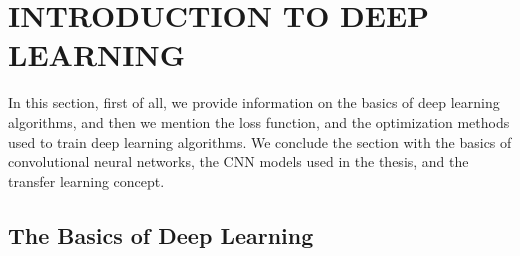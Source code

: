 \chapter{INTRODUCTION TO DEEP LEARNING}
\label{ch:CH3}

In this section, first of all, we provide information on the basics of deep learning algorithms, and then we mention the loss function, and the optimization methods used to train deep learning algorithms. We conclude the section with the basics of convolutional neural networks, the CNN models used in the thesis, and the transfer learning concept.

\begin{figure}[h]
	\centering
	\vspace*{1mm}
	\label{basic_neuron}
\end{figure}

\section{The Basics of Deep Learning}

